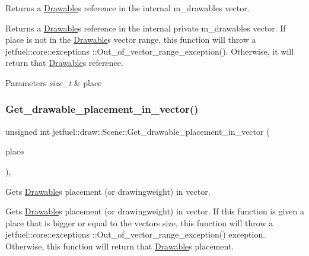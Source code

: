 Returns a \hyperlink{classjetfuel_1_1draw_1_1Drawable}{Drawable}\textquotesingle{}s reference in the internal m\+\_\+drawables vector. 

Returns a \hyperlink{classjetfuel_1_1draw_1_1Drawable}{Drawable}\textquotesingle{}s reference in the internal private m\+\_\+drawables vector. If place is not in the \hyperlink{classjetfuel_1_1draw_1_1Drawable}{Drawable}\textquotesingle{}s vector range, this function will throw a jetfuel\+::core\+::exceptions \+::\+Out\+\_\+of\+\_\+vector\+\_\+range\+\_\+exception(). Otherwise, it will return that \hyperlink{classjetfuel_1_1draw_1_1Drawable}{Drawable}\textquotesingle{}s reference.


\begin{DoxyParams}{Parameters}
{\em size\+\_\+t} & place \\
\hline
\end{DoxyParams}
\mbox{\label{classjetfuel_1_1draw_1_1Scene_a92228a8f31c8e2e1fe1e3d0a12940b1a}} 
\subsubsection{\texorpdfstring{Get\+\_\+drawable\+\_\+placement\+\_\+in\+\_\+vector()}{Get\_drawable\_placement\_in\_vector()}}
{\footnotesize\ttfamily unsigned int jetfuel\+::draw\+::\+Scene\+::\+Get\+\_\+drawable\+\_\+placement\+\_\+in\+\_\+vector (\begin{DoxyParamCaption}\item[{size\+\_\+t}]{place }\end{DoxyParamCaption})\hspace{0.3cm}{\ttfamily [inline]}, {\ttfamily [protected]}}



Gets \hyperlink{classjetfuel_1_1draw_1_1Drawable}{Drawable}\textquotesingle{}s placement (or drawingweight) in vector. 

Gets \hyperlink{classjetfuel_1_1draw_1_1Drawable}{Drawable}\textquotesingle{}s placement (or drawingweight) in vector. If this function is given a place that is bigger or equal to the vector\textquotesingle{}s size, this function will throw a jetfuel\+::core\+::exceptions \+::\+Out\+\_\+of\+\_\+vector\+\_\+range\+\_\+exception() exception. Otherwise, this function will return that \hyperlink{classjetfuel_1_1draw_1_1Drawable}{Drawable}\textquotesingle{}s placement.


